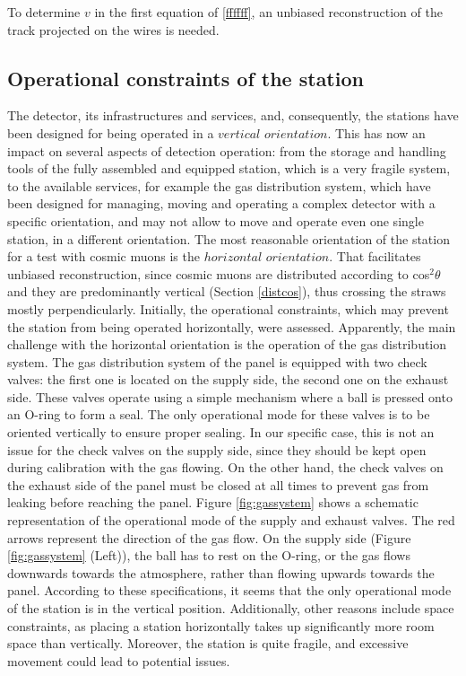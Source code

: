 To determine $v$ in the first equation of \ref{ffffff}, 
an unbiased reconstruction of the 
track projected on the wires is needed.


\subsection{Operational constraints of the station}\label{gassystem}
The detector, its infrastructures 
and services, and, consequently, the stations have been
designed for being operated in a 
$vertical$ $orientation$. This has now an impact 
on several aspects of detection operation: from 
the storage and
handling tools of the fully assembled and 
equipped station, which is a very fragile system, to
the available services, for example the gas 
distribution system, which have been designed for
managing, moving and operating a complex 
detector with a specific orientation, and may not
allow to move and operate even one single 
station, in a different orientation. 
The most reasonable orientation of the station for a test with
cosmic muons is the $horizontal$ $orientation$. 
That facilitates unbiased 
reconstruction, since cosmic muons are distributed according to 
cos$^2\theta$ and they are predominantly vertical 
(Section \ref{distcos}), thus crossing the straws mostly perpendicularly.
Initially, the operational constraints, which may prevent the station from being operated horizontally, were assessed.
Apparently, the main challenge with the horizontal orientation is the operation of the gas
distribution system. The gas distribution system of the panel is equipped with two check valves:
the first one is located on the supply side, the second one on the exhaust side. These valves
operate using a simple mechanism where a ball is pressed onto an O-ring to form a seal. The
only operational mode for these valves is to be oriented vertically to ensure proper sealing. In
our specific case, this is not an issue for the check valves on the supply side, since they should
be kept open during calibration with the gas flowing. On the other hand, the check valves on
the exhaust side of the panel must be closed at all times to prevent gas from leaking before
reaching the panel. Figure \ref{fig:gassystem} shows a schematic 
representation of the operational mode of the supply 
and exhaust valves. The red arrows represent the 
direction of the gas flow. On the supply side (Figure 
\ref{fig:gassystem} (Left)), the ball has to rest on the 
O-ring, or the gas flows downwards towards the atmosphere, 
rather than flowing upwards towards the panel. According 
to these specifications, it seems that the only operational 
mode of the station is in the vertical position. 
Additionally, other reasons include space constraints, as placing 
a station horizontally takes up significantly more room space than 
vertically. Moreover, the station is quite fragile, and 
excessive movement could lead to potential issues.

